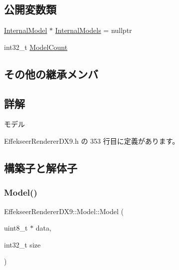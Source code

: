\subsection*{公開変数類}
\begin{DoxyCompactItemize}
\item 
\mbox{\hyperlink{struct_effekseer_renderer_d_x9_1_1_model_1_1_internal_model}{Internal\+Model}} $\ast$ \mbox{\hyperlink{class_effekseer_renderer_d_x9_1_1_model_a712d95cfe8c2223a708038c7132e60f5}{Internal\+Models}} = nullptr
\item 
int32\+\_\+t \mbox{\hyperlink{class_effekseer_renderer_d_x9_1_1_model_a993f041558265db631654723ca973e0a}{Model\+Count}}
\end{DoxyCompactItemize}
\subsection*{その他の継承メンバ}


\subsection{詳解}
モデル 

 Effekseer\+Renderer\+D\+X9.\+h の 353 行目に定義があります。



\subsection{構築子と解体子}
\mbox{\label{class_effekseer_renderer_d_x9_1_1_model_a2cc666c9789232bbe6bb09e5cf3fad6a}} 
\subsubsection{\texorpdfstring{Model()}{Model()}}
{\footnotesize\ttfamily Effekseer\+Renderer\+D\+X9\+::\+Model\+::\+Model (\begin{DoxyParamCaption}\item[{uint8\+\_\+t $\ast$}]{data,  }\item[{int32\+\_\+t}]{size }\end{DoxyParamCaption})\hspace{0.3cm}{\ttfamily [inline]}}



